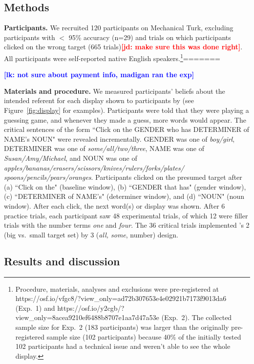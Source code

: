 \documentclass[10pt,letterpaper]{article}
\newcommand{\figref}[1]{Figure~\ref{#1}}
\newcommand{\jd}[1]{\textcolor{Red}{\textbf{[jd: #1]}}}
\newcommand{\lk}[1]{\textcolor{Blue}{\textbf{[lk: #1]}}}
\begin{document}
\subsection{Methods}

\textbf{Participants.} We recruited 120 participants on Mechanical Turk, excluding participants with $<$ 95\% accuracy (n=29) and trials on which participants clicked on the wrong target (665 trials)\jd{make sure this was done right}. All participants were self-reported native English speakers.\footnote{Procedure, materials, analyses and exclusions were pre-registered at https://osf.io/vfgc8/?view\_only=ad72b307653e4e02921b7173f9013\hspace{3pt}da6 (Exp.~1) and https://osf.io/y2cgb/?view\_only=8acea9210ef6488b\hspace{3pt}8707e1aa7d47a53e (Exp.~2). The collected sample size for Exp.~2 (183 participants) was larger than the originally pre-registered sample size (102 participants) because 40\% of the initially tested 102 participants had a technical issue and weren't able to see the whole display.}=======

\lk{not sure about payment info, madigan ran the exp}

\textbf{Materials and procedure.} We measured participants' beliefs about the intended referent for each display shown to participants by  (see \figref{fig:display} for examples). Participants were told that they were playing a guessing game, and whenever they made a guess, more words would appear. The critical sentences of the form ``Click on the GENDER who has DETERMINER  of NAME's NOUN" were revealed incrementally. GENDER was one of \emph{boy/girl}, DETERMINER was one of \emph{some/all/two/three}, NAME was one of \emph{Susan/Amy/Michael}, and NOUN was one of \emph{apples/bananas/erasers/scissors/knives/rulers/forks/plates/
spoons/pencils/pears/oranges}.  Participants clicked on the presumed target after (a) ``Click on the" (baseline window), (b) ``GENDER that has" (gender window), (c) ``DETERMINER of NAME's" (determiner window), and (d) ``NOUN" (noun window). After each click, the next word(s) or display was shown. After 6 practice trials, each participant saw 48 experimental trials, of which 12 were filler trials with the number terms \emph{one} and \emph{four}. The 36 critical trials implemented 's 2 (big vs.~small target set) by 3 (\emph{all, some}, number) design. 


\subsection{Results and discussion}
\end{document}
